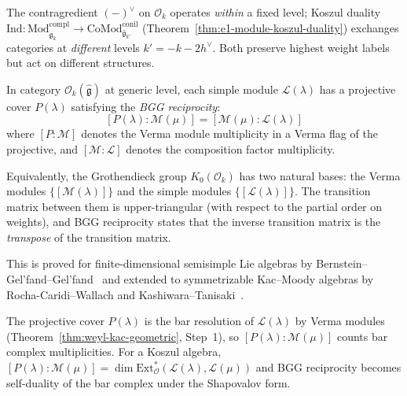 \begin{remark}
\label{rem:contragredient-koszul}
The contragredient $(-)^\vee$ on $\mathcal{O}_k$ operates \emph{within} a fixed level; Koszul duality $\mathrm{Ind}\colon \mathrm{Mod}^{\mathrm{compl}}_{\widehat{\mathfrak{g}}_k} \to \mathrm{CoMod}^{\mathrm{conil}}_{\widehat{\mathfrak{g}}_{k'}}$ (Theorem~\ref{thm:e1-module-koszul-duality}) exchanges categories at \emph{different} levels $k' = -k - 2h^\vee$.  Both preserve highest weight labels but act on different structures.
\end{remark}

\begin{theorem}
\label{thm:bgg-reciprocity}
In category $\mathcal{O}_k(\widehat{\mathfrak{g}})$ at generic level,
each simple module $\mathcal{L}(\lambda)$ has a projective cover
$P(\lambda)$ satisfying the \emph{BGG reciprocity}:
\begin{equation}\label{eq:bgg-reciprocity}
[P(\lambda) : \mathcal{M}(\mu)]
= [\mathcal{M}(\mu) : \mathcal{L}(\lambda)]
\end{equation}
where $[P : \mathcal{M}]$ denotes the Verma module multiplicity in
a Verma flag of the projective, and
$[\mathcal{M} : \mathcal{L}]$ denotes the composition factor
multiplicity.

Equivalently, the Grothendieck group $K_0(\mathcal{O}_k)$ has two
natural bases: the Verma modules $\{[\mathcal{M}(\lambda)]\}$ and the
simple modules $\{[\mathcal{L}(\lambda)]\}$.  The transition matrix
between them is upper-triangular (with respect to the partial order
on weights), and BGG reciprocity states that the inverse transition
matrix is the \emph{transpose} of the transition matrix.

This is proved for finite-dimensional semisimple Lie algebras by
Bernstein--Gel'fand--Gel'fand~\cite{BGG76} and extended to
symmetrizable Kac--Moody algebras by Rocha-Caridi--Wallach and
Kashiwara--Tanisaki~\cite{KT95}.
\end{theorem}

\begin{remark}
\label{rem:bgg-bar-cobar}
The projective cover $P(\lambda)$ is the bar resolution of $\mathcal{L}(\lambda)$ by Verma modules (Theorem~\ref{thm:weyl-kac-geometric}, Step~1), so $[P(\lambda) : \mathcal{M}(\mu)]$ counts bar complex multiplicities.  For a Koszul algebra, $[P(\lambda) : \mathcal{M}(\mu)] = \dim \mathrm{Ext}^*_{\mathcal{O}}(\mathcal{L}(\lambda), \mathcal{L}(\mu))$ and BGG reciprocity becomes self-duality of the bar complex under the Shapovalov form.
\end{remark}

